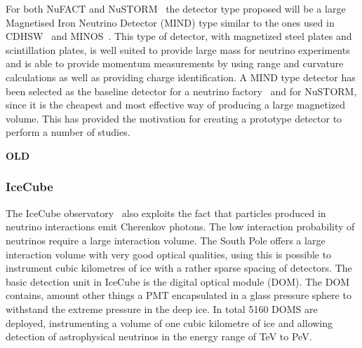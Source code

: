 For both NuFACT and NuSTORM~\cite{77nustorm} the detector type proposed will be a large Magnetised Iron Neutrino Detector (MIND) type  similar to the ones used in CDHSW~\cite{40CDHSW} and MINOS~\cite{MINOS, NuFACTIDS}. This type of detector, with magnetized steel plates and scintillation plates, is well suited to provide large mass for neutrino experiments and is able to provide momentum measurements by using range and curvature calculations as well as providing charge identification. A MIND type detector has been selected as the baseline detector for a neutrino factory~\cite{ISS, 27Bross} and for NuSTORM, since it is the cheapest and most effective way of producing a large magnetized volume. This has provided the motivation for creating a prototype detector to perform a number of studies.





\textbf{OLD}

\subsubsection{IceCube}
The IceCube observatory~\cite{43IceCube} also exploits the fact that particles produced in neutrino interactions emit Cherenkov photons. The low interaction probability of neutrinos require a large interaction volume. The South Pole offers a large interaction volume with very good optical qualities, using this is possible to instrument cubic kilometres of ice with a rather sparse spacing of detectors. The basic detection unit in IceCube is the digital optical module (DOM). The DOM contains, amount other things a PMT encapsulated in a glass pressure sphere to withstand the extreme pressure in the deep ice. In total 5160 DOMS are deployed, instrumenting a volume of one cubic kilometre of ice and allowing detection of astrophysical neutrinos in the energy range of TeV to PeV.

